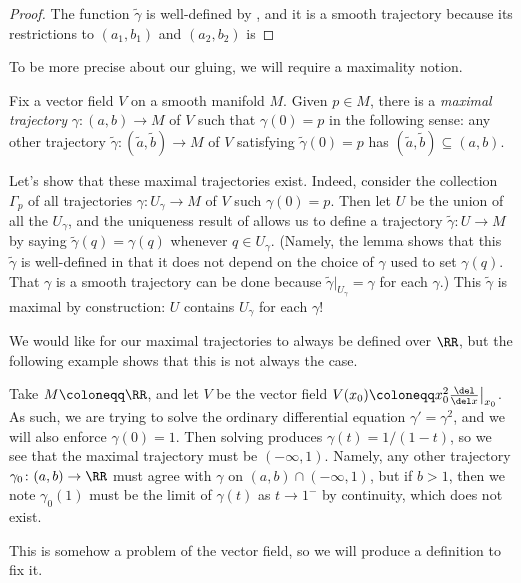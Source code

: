\documentclass[../notes.tex]{subfiles}
\begin{document}
\begin{proof}
	The function $\widetilde\gamma$ is well-defined by , and it is a smooth trajectory because its restrictions to $(a_1,b_1)$ and $(a_2,b_2)$ is 
\end{proof}
To be more precise about our gluing, we will require a maximality notion.
\begin{definition}
	Fix a vector field $V$ on a smooth manifold $M$. Given $p\in M$, there is a \textit{maximal trajectory} $\gamma\colon(a,b)\to M$ of $V$ such that $\gamma(0)=p$ in the following sense: any other trajectory $\widetilde\gamma\colon(\widetilde a,\widetilde b)\to M$ of $V$ satisfying $\widetilde\gamma(0)=p$ has $(\widetilde a,\widetilde b)\subseteq(a,b)$.
\end{definition}
\begin{remark}
	Let's show that these maximal trajectories exist. Indeed, consider the collection $\Gamma_p$ of all trajectories $\gamma\colon U_\gamma\to M$ of $V$ such $\gamma(0)=p$. Then let $U$ be the union of all the $U_\gamma$, and the uniqueness result of  allows us to define a trajectory $\widetilde\gamma\colon U\to M$ by saying $\widetilde\gamma(q)=\gamma(q)$ whenever $q\in U_{\gamma}$. (Namely, the lemma shows that this $\widetilde\gamma$ is well-defined in that it does not depend on the choice of $\gamma$ used to set $\gamma(q)$. That $\gamma$ is a smooth trajectory can be done because $\widetilde\gamma|_{U_\gamma}=\gamma$ for each $\gamma$.) This $\widetilde\gamma$ is maximal by construction: $U$ contains $U_{\gamma}$ for each $\gamma$!
\end{remark}
We would like for our maximal trajectories to always be defined over $\RR$, but the following example shows that this is not always the case.
\begin{example}
	Take $M\coloneqq\RR$, and let $V$ be the vector field $V(x_0)\coloneqq x_0^2\frac{\del}{\del x}\big|_{x_0}$. As such, we are trying to solve the ordinary differential equation $\gamma'=\gamma^2$, and we will also enforce $\gamma(0)=1$. Then solving produces $\gamma(t)=1/(1-t)$, so we see that the maximal trajectory must be $(-\infty,1)$. Namely, any other trajectory $\gamma_0\colon(a,b)\to\RR$ must agree with $\gamma$ on $(a,b)\cap(-\infty,1)$, but if $b>1$, then we note $\gamma_0(1)$ must be the limit of $\gamma(t)$ as $t\to1^-$ by continuity, which does not exist.
\end{example}
This is somehow a problem of the vector field, so we will produce a definition to fix it.
\end{document}
